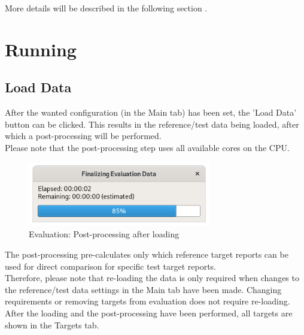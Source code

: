 More details will be described in the following section .

\section{Running}
\label{sec:eval_run} 

\subsection{Load Data}
\label{sec:eval_run_load} 

After the wanted configuration (in the Main tab) has been set, the 'Load Data' button can be clicked. This results in the reference/test data being loaded, after which a post-processing will be performed. \\

Please note that the post-processing step uses all available cores on the CPU.

\begin{figure}[H]
  \centering 
    \includegraphics[width=8cm]{../screenshots/eval_post.png}
  \caption{Evaluation: Post-processing after loading}
\end{figure}

The post-processing pre-calculates only which reference target reports can be used for direct comparison for specific test target reports. \\

Therefore, please note that re-loading the data is only required when changes to the reference/test data settings in the Main tab have been made. Changing requirements or removing targets from evaluation does not require re-loading. \\

After the loading and the post-processing have been performed, all targets are shown in the Targets tab.

